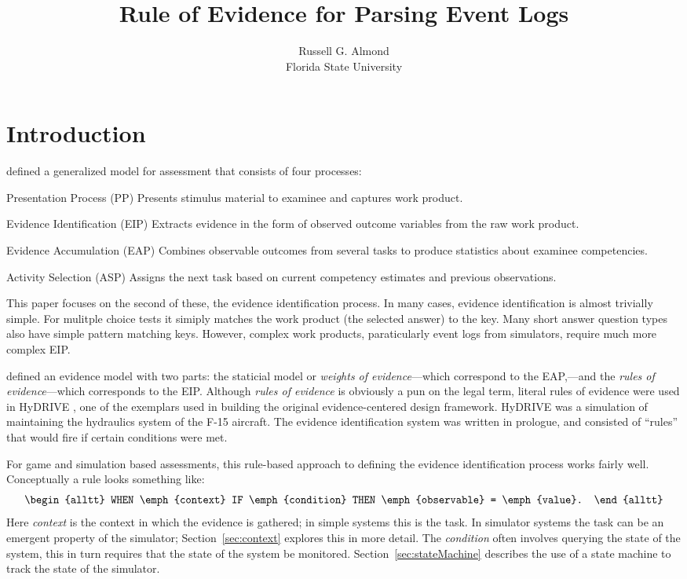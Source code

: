 \documentclass{article}
\title{\large{\bf Rule of Evidence for Parsing Event Logs}}
\author{Russell G. Almond\\ Florida State University\\ }
\begin{document}
  \section{Introduction}

   defined a generalized model for assessment that
  consists of four processes:
  \begin{describe}
    \item[Presentation Process (PP)]{Presents stimulus material to examinee
      and captures work product.}
    \item[Evidence Identification (EIP)]{Extracts evidence in the form of
      observed outcome variables from the raw work product.}
    \item[Evidence Accumulation (EAP)]{Combines observable outcomes from
      several tasks to produce statistics about examinee
      competencies.}
    \item[Activity Selection (ASP)]{Assigns the next task based on current
      competency estimates and previous observations.}
  \end{describe}
  This paper focuses on the second of these, the evidence
  identification process.  In many cases, evidence identification is
  almost trivially simple.  For mulitple choice tests it simiply
  matches the work product (the selected answer) to the key.  Many
  short answer question types also have simple pattern matching keys.
  However, complex work products, paraticularly event logs from
  simulators, require much more complex EIP.

   defined an evidence model with two parts:
  the staticial model or \textit{weights of evidence}---which
  correspond to the EAP,---and the \textit{rules of evidence}---which
  corresponds to the EIP.  Although \textit{rules of evidence} is 
  obviously a pun on the legal term, literal rules of evidence were
  used in HyDRIVE \cite{HyDRIVE}, one of the exemplars used in
  building the original evidence-centered design framework.  HyDRIVE
  was a simulation of maintaining the hydraulics system of the F-15
  aircraft.  The evidence identification system was written in
  prologue, and consisted of ``rules'' that would fire if certain
  conditions were met.

  For game and simulation based assessments, this rule-based approach
  to defining the evidence identification process works fairly well.
  Conceptually a rule looks something like:
  \begin{equation*}
    \begin{alltt} WHEN \emph{context} IF \emph{condition} THEN
      \emph{observable} = \emph{value}.
    \end{alltt}
  \end{equation*}
  Here \emph{context} is the context in which the evidence is
  gathered; in simple systems this is the task.  In simulator systems
  the task can be an emergent property of the simulator;
  Section~\ref{sec:context} explores this in more detail. The
  \emph{condition} often involves querying the state of the system,
  this in turn requires that the state of the system be monitored.
  Section~\ref{sec:stateMachine} describes the use of a state machine
  to track the state of the simulator.
\end{document}
